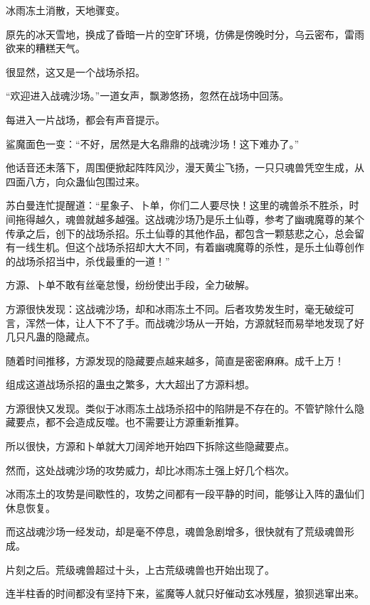 
\begin{this_body}



冰雨冻土消散，天地骤变。

原先的冰天雪地，换成了昏暗一片的空旷环境，仿佛是傍晚时分，乌云密布，雷雨欲来的糟糕天气。

很显然，这又是一个战场杀招。

“欢迎进入战魂沙场。”一道女声，飘渺悠扬，忽然在战场中回荡。

每进入一片战场，都会有声音提示。

鲨魔面色一变：“不好，居然是大名鼎鼎的战魂沙场！这下难办了。”

他话音还未落下，周围便掀起阵阵风沙，漫天黄尘飞扬，一只只魂兽凭空生成，从四面八方，向众蛊仙包围过来。

苏白曼连忙提醒道：“星象子、卜单，你们二人要尽快！这里的魂兽杀不胜杀，时间拖得越久，魂兽就越多越强。这战魂沙场乃是乐土仙尊，参考了幽魂魔尊的某个传承之后，创下的战场杀招。乐土仙尊的其他作品，都包含一颗慈悲之心，总会留有一线生机。但这个战场杀招却大大不同，有着幽魂魔尊的杀性，是乐土仙尊创作的战场杀招当中，杀伐最重的一道！”

方源、卜单不敢有丝毫怠慢，纷纷使出手段，全力破解。

方源很快发现：这战魂沙场，却和冰雨冻土不同。后者攻势发生时，毫无破绽可言，浑然一体，让人下不了手。而战魂沙场从一开始，方源就轻而易举地发现了好几只凡蛊的隐藏点。

随着时间推移，方源发现的隐藏要点越来越多，简直是密密麻麻。成千上万！

组成这道战场杀招的蛊虫之繁多，大大超出了方源料想。

方源很快又发现。类似于冰雨冻土战场杀招中的陷阱是不存在的。不管铲除什么隐藏要点，都不会造成反噬。也不需要让方源重新推算。

所以很快，方源和卜单就大刀阔斧地开始四下拆除这些隐藏要点。

然而，这处战魂沙场的攻势威力，却比冰雨冻土强上好几个档次。

冰雨冻土的攻势是间歇性的，攻势之间都有一段平静的时间，能够让入阵的蛊仙们休息恢复。

而这战魂沙场一经发动，却是毫不停息，魂兽急剧增多，很快就有了荒级魂兽形成。

片刻之后。荒级魂兽超过十头，上古荒级魂兽也开始出现了。

连半柱香的时间都没有坚持下来，鲨魔等人就只好催动玄冰残屋，狼狈逃窜出来。


\end{this_body}
